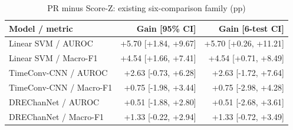\begin{table}[t]
\centering
\caption{PR minus Score-Z: existing six-comparison family (pp)}
\small
\begin{tabular}{lrr}
\toprule
Model / metric & Gain [95\% CI] & Gain [6-test CI] \\
\midrule
Linear SVM / AUROC & +5.70 [+1.84, +9.67] & +5.70 [+0.26, +11.21] \\
Linear SVM / Macro-F1 & +4.54 [+1.66, +7.41] & +4.54 [+0.71, +8.49] \\
TimeConv-CNN / AUROC & +2.63 [-0.73, +6.28] & +2.63 [-1.72, +7.64] \\
TimeConv-CNN / Macro-F1 & +0.75 [-1.98, +3.44] & +0.75 [-2.98, +4.28] \\
DREChanNet / AUROC & +0.51 [-1.88, +2.80] & +0.51 [-2.68, +3.61] \\
DREChanNet / Macro-F1 & +1.33 [-0.22, +2.94] & +1.33 [-0.72, +3.49] \\
\bottomrule
\end{tabular}
\end{table}
